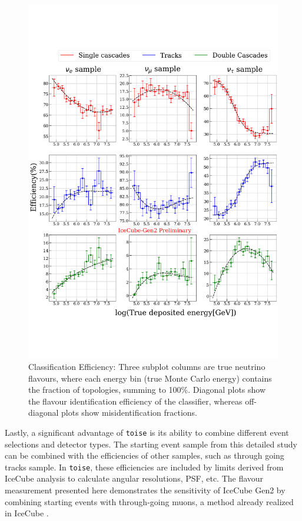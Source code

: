 \begin{figure}[h!]

    \centering
    \includegraphics{./figures/gen2/ClassificationEff_small_watermark.pdf}
    \caption{Classification Efficiency: Three subplot columns are true neutrino flavours, where each energy bin (true Monte Carlo energy) contains the fraction of topologies, summing to 100\%. Diagonal plots show the flavour identification efficiency of the classifier, whereas off-diagonal plots show misidentification fractions.
    }
\end{figure}

Lastly, a significant advantage of \texttt{toise} is its ability to combine different event selections and detector types. The starting event sample from this detailed study can be combined with the efficiencies of other samples, such as through going tracks sample. In \texttt{toise}, these efficiencies are included by limits derived from IceCube analysis  to calculate angular resolutions, PSF, etc. The flavour measurement presented here demonstrates the sensitivity of IceCube Gen2 by combining starting events with through-going muons, a method already realized in IceCube .

